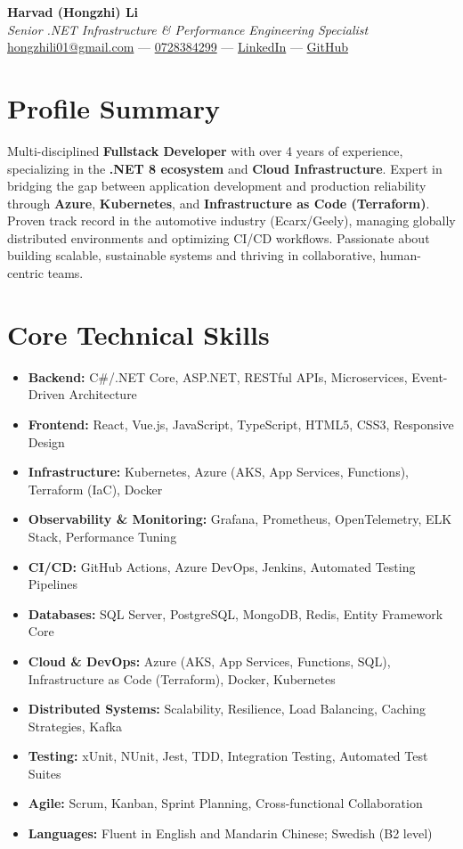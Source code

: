 \documentclass[11pt,a4paper]{article}
\begin{document}
\pagestyle{empty}

\begin{center}
{\LARGE \textbf{Harvad (Hongzhi) Li}}\\[10pt]
{\Large \textit{Senior .NET Infrastructure \& Performance Engineering Specialist}}\\[10pt]
\href{mailto:hongzhili01@gmail.com}{hongzhili01@gmail.com} --- \href{tel:0728384299}{0728384299} --- \href{https://www.linkedin.com/in/harvad/}{LinkedIn} --- \href{https://github.com/bluehawana}{GitHub}
\end{center}

\section*{Profile Summary}
Multi-disciplined \textbf{Fullstack Developer} with over 4 years of experience, specializing in the \textbf{.NET 8 ecosystem} and \textbf{Cloud Infrastructure}. Expert in bridging the gap between application development and production reliability through \textbf{Azure}, \textbf{Kubernetes}, and \textbf{Infrastructure as Code (Terraform)}. Proven track record in the automotive industry (Ecarx/Geely), managing globally distributed environments and optimizing CI/CD workflows. Passionate about building scalable, sustainable systems and thriving in collaborative, human-centric teams.

\section*{Core Technical Skills}
\begin{itemize}[noitemsep]
\item \textbf{Backend:} C\#/.NET Core, ASP.NET, RESTful APIs, Microservices, Event-Driven Architecture
\item \textbf{Frontend:} React, Vue.js, JavaScript, TypeScript, HTML5, CSS3, Responsive Design
\item \textbf{Infrastructure:} Kubernetes, Azure (AKS, App Services, Functions), Terraform (IaC), Docker
\item \textbf{Observability \& Monitoring:} Grafana, Prometheus, OpenTelemetry, ELK Stack, Performance Tuning
\item \textbf{CI/CD:} GitHub Actions, Azure DevOps, Jenkins, Automated Testing Pipelines
\item \textbf{Databases:} SQL Server, PostgreSQL, MongoDB, Redis, Entity Framework Core
\item \textbf{Cloud \& DevOps:} Azure (AKS, App Services, Functions, SQL), Infrastructure as Code (Terraform), Docker, Kubernetes
\item \textbf{Distributed Systems:} Scalability, Resilience, Load Balancing, Caching Strategies, Kafka
\item \textbf{Testing:} xUnit, NUnit, Jest, TDD, Integration Testing, Automated Test Suites
\item \textbf{Agile:} Scrum, Kanban, Sprint Planning, Cross-functional Collaboration
\item \textbf{Languages:} Fluent in English and Mandarin Chinese; Swedish (B2 level)
\end{itemize}
\end{document}
